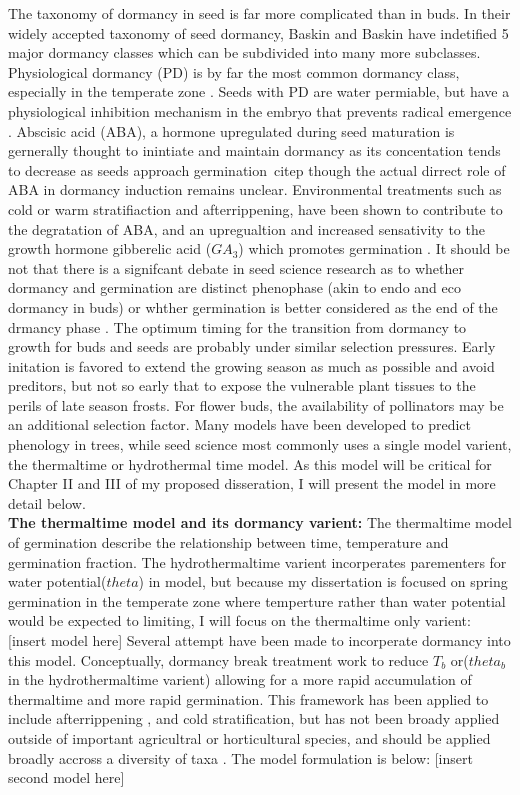 \documentclass{article}\usepackage[]{graphicx}\usepackage[]{color}
\begin{document}
The taxonomy of dormancy in seed is far more complicated than in buds. In their widely accepted taxonomy of seed dormancy, Baskin and Baskin \citeyear{} have indetified 5 major dormancy classes which can be subdivided into many more subclasses. Physiological dormancy (PD) is by far the most common dormancy class, especially in the temperate zone \citep{}. Seeds with PD are water permiable, but have a physiological inhibition mechanism in the embryo that prevents radical emergence \citep{}. Abscisic acid (ABA), a hormone upregulated during seed maturation is gernerally thought to inintiate and maintain dormancy as its concentation tends to decrease as seeds approach germination\ citep{} though the actual dirrect role of ABA in dormancy induction remains unclear. Environmental treatments such as cold or warm stratifiaction and afterrippening, have been shown to contribute to the degratation of ABA, and an upregualtion and increased sensativity to the growth hormone gibberelic acid ($GA_3$) which promotes germination \citep{}. It should be not that there is a signifcant debate in seed science research as to whether dormancy and germination are distinct phenophase (akin to endo and eco dormancy in buds) or whther germination is better considered as the end of the drmancy phase \citep{}.
\indent The optimum timing for the transition from dormancy to growth for buds and seeds are probably under similar selection pressures. Early initation is favored to extend the growing season as much as possible and avoid preditors, but not so early that to expose the vulnerable plant tissues to the perils of late season frosts. For flower buds, the availability of pollinators may be an additional selection factor. Many models have been developed to predict phenology in trees, while seed science most commonly uses a single model varient, the thermaltime or hydrothermal time model. As this model will be critical for Chapter II and III of my proposed disseration, I will present the model in more detail below.\\
\indent\textbf{The thermaltime model and its dormancy varient:} The thermaltime model of germination describe the relationship between time, temperature and germination fraction. The hydrothermaltime varient incorperates parementers for water potential($theta$) in model, but because my dissertation is focused on spring germination in the temperate zone where temperture rather than water potential would be expected to limiting, I will focus on the thermaltime only varient:
[insert model here]
Several attempt have been made to incorperate dormancy into this model. Conceptually, dormancy break treatment work to reduce $T_b$ or($theta_b$ in the hydrothermaltime varient) allowing for a more rapid accumulation of thermaltime and more rapid germination. This framework has been applied to include afterrippening \citep{}, and cold stratification\citep{}, but has not been broady applied outside of important agricultral or horticultural species, and should be applied broadly accross a diversity of taxa \citep{}. The model formulation is below:
[insert second model here]\\
\end{document}

